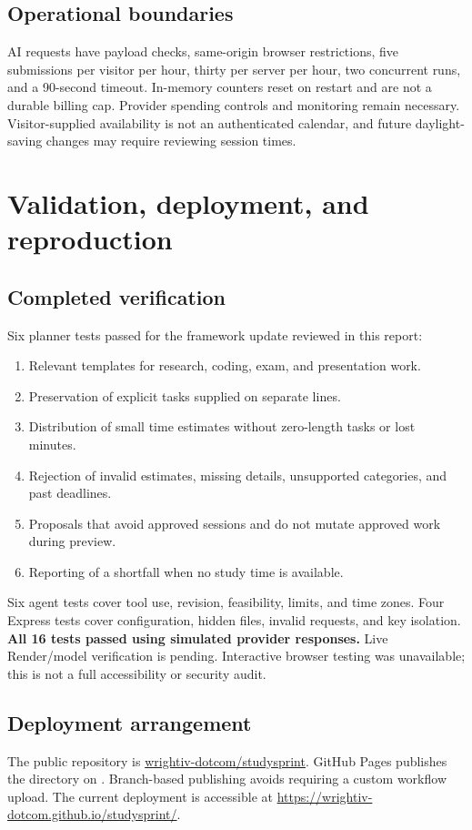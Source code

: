 \documentclass[11pt,letterpaper]{article}
\newcommand{\file}[1]{\texttt{\small\detokenize{#1}}}
\begin{document}
\subsection{Operational boundaries}
AI requests have payload checks, same-origin browser restrictions, five submissions per visitor per hour, thirty per server per hour, two concurrent runs, and a 90-second timeout. In-memory counters reset on restart and are not a durable billing cap. Provider spending controls and monitoring remain necessary. Visitor-supplied availability is not an authenticated calendar, and future daylight-saving changes may require reviewing session times.

\newpage
\section{Validation, deployment, and reproduction}
\subsection{Completed verification}
Six planner tests passed for the framework update reviewed in this report:
\begin{enumerate}
\item Relevant templates for research, coding, exam, and presentation work.
\item Preservation of explicit tasks supplied on separate lines.
\item Distribution of small time estimates without zero-length tasks or lost minutes.
\item Rejection of invalid estimates, missing details, unsupported categories, and past deadlines.
\item Proposals that avoid approved sessions and do not mutate approved work during preview.
\item Reporting of a shortfall when no study time is available.
\end{enumerate}
Six agent tests cover tool use, revision, feasibility, limits, and time zones. Four Express tests cover configuration, hidden files, invalid requests, and key isolation. \textbf{All 16 tests passed using simulated provider responses.} Live Render/model verification is pending. Interactive browser testing was unavailable; this is not a full accessibility or security audit.

\subsection{Deployment arrangement}
The public repository is \href{https://github.com/wrightiv-dotcom/studysprint}{wrightiv-dotcom/studysprint}. GitHub Pages publishes the \file{docs/} directory on \file{main}. Branch-based publishing avoids requiring a custom workflow upload. The current deployment is accessible at \url{https://wrightiv-dotcom.github.io/studysprint/}.
\end{document}
